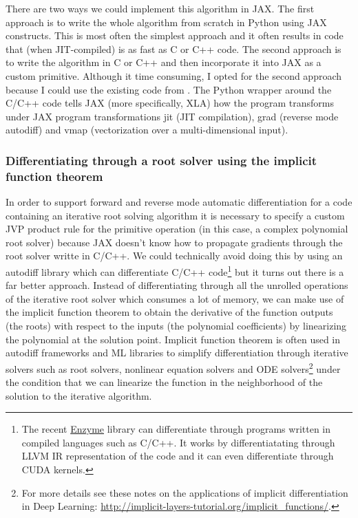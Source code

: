 \documentclass[12pt,dvipsnames]{report}
\newcommand{\ssf}[1]{\textsf{#1}}
\begin{document}
There are two ways we could implement this algorithm in \ssf{JAX}. The first
approach is to write the whole algorithm from scratch in \ssf{Python} using \ssf{JAX} 
constructs. This is most often the simplest approach and it often results in code that 
(when JIT-compiled) is as fast as \ssf{C} or \ssf{C++} code. The second approach is to 
write the algorithm in \ssf{C} or \ssf{C++} and then incorporate it into \ssf{JAX} as a 
custom primitive. Although it time consuming, I opted for the second approach because 
I could use the existing code from \citet{cameron2021}. The Python wrapper around the 
\ssf{C/C++} code tells \ssf{JAX} (more specifically, \ssf{XLA}) how the program transforms 
under \ssf{JAX} program transformations \ssf{jit} (JIT compilation),
\ssf{grad} (reverse mode autodiff) and \ssf{vmap} (vectorization over a multi-dimensional 
input). 

\subsubsection{Differentiating through a root solver using the implicit function theorem}

In order to support forward and reverse mode automatic differentiation for a code containing
an iterative root solving algorithm it is necessary to specify a custom JVP product rule 
for the primitive operation (in this case, a complex polynomial root solver) because 
\ssf{JAX} doesn't know how to propagate gradients through the root solver writte in 
\ssf{C/C++}.  We could technically avoid doing this by using an autodiff library which can
differentiate \ssf{C/C++} code\footnote{The recent
    \href{https://enzyme.mit.edu/}{Enzyme} library can differentiate through
    programs written in compiled languages such as \ssf{C/C++}. It works by
    differentiatating through LLVM IR representation of the code and it can even differentiate 
    through \ssf{CUDA} kernels.} but it turns out there is a far better approach. 
    Instead of differentiating through all the unrolled operations of the iterative 
root solver which consumes a lot of memory, we can make use of the \ssf{implicit function 
theorem} to obtain the derivative of the function outputs (the roots) with respect to the 
inputs (the polynomial coefficients) by linearizing the polynomial at the solution point.
Implicit function theorem is often used in autodiff frameworks and ML libraries  to simplify 
differentiation through iterative solvers such as root solvers, nonlinear equation solvers
and ODE solvers\footnote{
    For more details see these notes on the applications of implicit differentiation in Deep 
    Learning: \url{http://implicit-layers-tutorial.org/implicit_functions/}.
} under the condition that we can linearize the function in the neighborhood of the solution
to the iterative algorithm.
\end{document}
